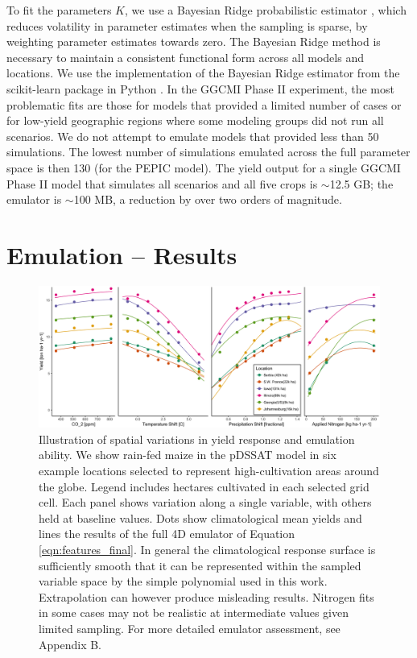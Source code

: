 \documentclass[esd, final]{copernicus} %
\begin{document}
To fit the parameters $K$, we use a Bayesian Ridge probabilistic estimator \citep{MacKay91}, which reduces volatility in parameter estimates when the sampling is sparse, by weighting parameter estimates towards zero. The Bayesian Ridge method is necessary to maintain a consistent functional form across all models and locations. We use the implementation of the Bayesian Ridge estimator from the scikit-learn package in Python \citep{scikit-learn}. In the GGCMI Phase II experiment, the most problematic fits are those for models that provided a limited number of cases or for low-yield geographic regions where some modeling groups did not run all scenarios. We do not attempt to emulate models that provided less than 50 simulations. The lowest number of simulations emulated across the full parameter space is then 130 (for the PEPIC model). The yield output for a single GGCMI Phase II model that simulates all scenarios and all five crops is $\sim$12.5 GB; the emulator is $\sim$100 MB, a reduction by over two orders of magnitude. 

\section{Emulation -- Results}
\label{S:5}

\begin{figure}[h]
\centering
    \includegraphics[width=16cm]{figures/regression_areas.png}
    \caption{Illustration of spatial variations in yield response and emulation ability. We show rain-fed maize in the pDSSAT model in six example locations selected to represent high-cultivation areas around the globe. Legend includes hectares cultivated in each selected grid cell. Each panel shows variation along a single variable, with others held at baseline values. Dots show climatological mean yields and lines the results of the full 4D emulator of Equation \ref{eqn:features_final}. In general the climatological response surface is sufficiently smooth that it can be represented within the sampled variable space by the simple polynomial used in this work. Extrapolation can however produce misleading results. Nitrogen fits in some cases may not be realistic at intermediate values given limited sampling. For more detailed emulator assessment, see Appendix B.}
   \label{fig:regression}
\end{figure}
\end{document}
